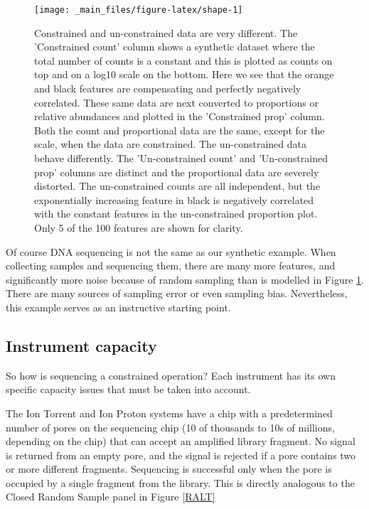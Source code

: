 \documentclass[onecolumn]{book}
\theoremstyle{definition}
\theoremstyle{definition}
\theoremstyle{definition}
\theoremstyle{remark}
\begin{document}
\begin{figure}

{\centering \texttt{[image: \_main\_files/figure-latex/shape-1]} 

}

\caption{Constrained and un-constrained data are very different. The 'Constrained count' column shows a synthetic dataset where the total number of counts is a constant and this is plotted as counts on top and on a log10 scale on the bottom. Here we see that the orange and black features are compensating and perfectly negatively correlated. These same data are next converted to proportions or relative abundances and plotted in the 'Constrained prop' column. Both the count and proportional data are the same, except for the scale, when the data are constrained. The un-constrained data behave differently. The 'Un-constrained count' and 'Un-constrained prop' columns are distinct and the proportional data are severely distorted. The un-constrained counts are all independent, but the  exponentially increasing feature in black is negatively correlated with the constant features in the un-constrained proportion plot. Only 5 of the 100 features are shown for clarity.}\label{fig:shape}
\end{figure}

Of course DNA sequencing is not the same as our synthetic example. When
collecting samples and sequencing them, there are many more features,
and significantly more noise because of random sampling than is modelled
in Figure \ref{fig:shape}. There are many sources of sampling error or
even sampling bias. Nevertheless, this example serves as an instructive
starting point.

\hypertarget{instrument-capacity}{%
\subsection{Instrument capacity}\label{instrument-capacity}}

So how is sequencing a constrained operation? Each instrument has its
own specific capacity issues that must be taken into account.

The Ion Torrent and Ion Proton systems have a chip with a predetermined
number of pores on the sequencing chip (10 of thousands to 10s of
millions, depending on the chip) that can accept an amplified library
fragment. No signal is returned from an empty pore, and the signal is
rejected if a pore contains two or more different fragments. Sequencing
is successful only when the pore is occupied by a single fragment from
the library. This is directly analogous to the Closed Random Sample
panel in Figure \ref{RALT}
\end{document}
